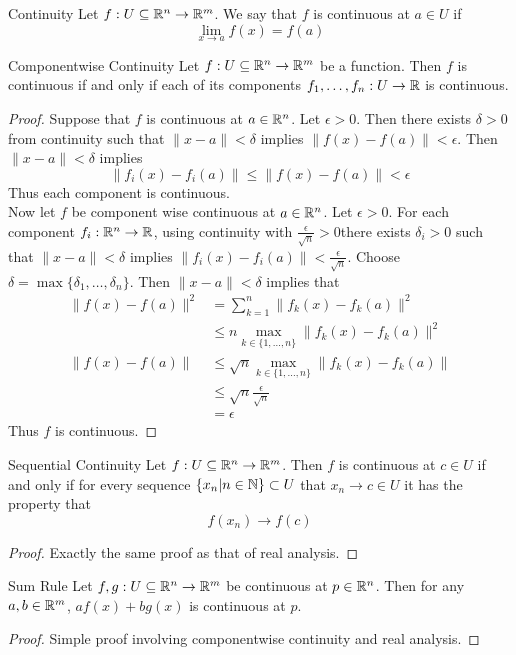 \documentclass[a4paper]{article}
\begin{document}
\begin{defn}{Continuity}{} Let $f:U\subseteq\mathbb{R}^n\to\mathbb{R}^m$. We say that $f$ is continuous at $a\in U$ if $$\lim_{x \to a}f(x)=f(a)$$
\end{defn}

\begin{thm}{Componentwise Continuity}{} Let $f:U\subseteq\mathbb{R}^n\to\mathbb{R}^m$ be a function. Then $f$ is continuous if and only if each of its components $f_1,\dots,f_n:U\to\mathbb{R}$ is continuous. 
\begin{proof}
Suppose that $f$ is continuous at $a\in\mathbb{R}^n$. Let $\epsilon>0$. Then there exists $\delta>0$ from continuity such that $\|x-a\|<\delta$ implies $\|f(x)-f(a)\|<\epsilon$. Then $\|x-a\|<\delta$ implies $$\|f_i(x)-f_i(a)\|\leq\|f(x)-f(a)\|<\epsilon$$ Thus each component is continuous. \\
Now let $f$ be component wise continuous at $a\in\mathbb{R}^n$. Let $\epsilon>0$. For each component $f_i:\mathbb{R}^n\to\mathbb{R}$, using continuity with $\frac{\epsilon}{\sqrt{n}}>0$there exists $\delta_i>0$ such that $\|x-a\|<\delta$ implies $\|f_i(x)-f_i(a)\|<\frac{\epsilon}{\sqrt{n}}$. Choose $\delta=\max\{\delta_1,\dots,\delta_n\}$. Then $\|x-a\|<\delta$ implies that 
\begin{align*}
\|f(x)-f(a)\|^2&=\sum_{k=1}^n\|f_k(x)-f_k(a)\|^2\\
&\leq n\max_{k\in\{1,\dots,n\}}\|f_k(x)-f_k(a)\|^2\\
\|f(x)-f(a)\|&\leq\sqrt{n}\max_{k\in\{1,\dots,n\}}\|f_k(x)-f_k(a)\|\\
&\leq\sqrt{n}\frac{\epsilon}{\sqrt{n}}\\
&=\epsilon
\end{align*}
Thus $f$ is continuous. 
\end{proof}
\end{thm}

\begin{thm}{Sequential Continuity}{} Let $f:U\subseteq\mathbb{R}^n\to\mathbb{R}^m$. Then $f$ is continuous at $c\in U$ if and only if for every sequence $\{x_n|n\in\mathbb{N}\}\subset U$ that $x_n\to c\in U$ it has the property that $$f(x_n)\to f(c)$$ 
\begin{proof}
Exactly the same proof as that of real analysis. 
\end{proof}
\end{thm}

\begin{prp}{Sum Rule}{} Let $f,g:U\subseteq\mathbb{R}^n\to\mathbb{R}^m$ be continuous at $p\in\mathbb{R}^n$. Then for any $a,b\in\mathbb{R}^m$, $af(x)+bg(x)$ is continuous at $p$. 
\begin{proof}
Simple proof involving componentwise continuity and real analysis. 
\end{proof}
\end{prp}
\end{document}
